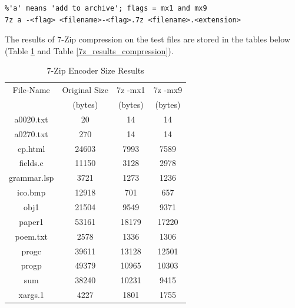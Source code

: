 \documentclass[12pt]{article}
\begin{document}
\begin{verbatim}
%'a' means 'add to archive'; flags = mx1 and mx9
7z a -<flag> <filename>-<flag>.7z <filename>.<extension>
\end{verbatim}

The results of 7-Zip compression on the test files are stored in the tables below (Table \ref{7z_results_size} and Table \ref{7z_results_compression}).

\begin{table}[H]
	\centering
	\begin{tabular}{| c | c | c | c |} 
		\hline
		File-Name & Original Size & 7z -mx1 & 7z -mx9\\
		& (bytes) & (bytes) & (bytes) \\
		\hline
		a0020.txt & 20 & 14 & 14\\
		\hline
		a0270.txt & 270 & 14 & 14\\
		\hline
		cp.html & 24603 & 7993 & 7589\\
		\hline
		fields.c & 11150 & 3128 & 2978\\
		\hline
		grammar.lsp & 3721 & 1273 & 1236\\
		\hline
		ico.bmp & 12918 & 701 & 657\\
		\hline
		obj1 & 21504 & 9549 & 9371\\
		\hline
		paper1 & 53161 & 18179 & 17220\\
		\hline
		poem.txt & 2578 & 1336 & 1306\\
		\hline
		progc & 39611 & 13128 & 12501\\
		\hline
		progp & 49379 & 10965 & 10303\\
		\hline
		sum & 38240 & 10231 & 9415\\
		\hline
		xargs.1 & 4227 & 1801 & 1755\\
		\hline
	\end{tabular}
	\caption{7-Zip Encoder Size Results}
	\label{7z_results_size}
\end{table}
\end{document}
